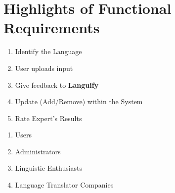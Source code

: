 \section{Highlights of Functional Requirements}
\label{sec:functional_requirements}


\begin{enumerate}[{\bf BE}1:]
	\item Identify the Language
	\item User uploads input	
	\item Give feedback to \textbf{Languify}
	\item Update (Add/Remove)  within the System
	\item Rate Expert's Results
\end{enumerate}

\begin{enumerate}[{\bf VP}1:]
	\item Users
	\item Administrators
	\item Linguistic Enthusiasts
	\item Language Translator Companies
\end{enumerate}



\begin{enumerate}[{\bf BE1:}]


	
	

	

	

	


	


	
\end{enumerate}